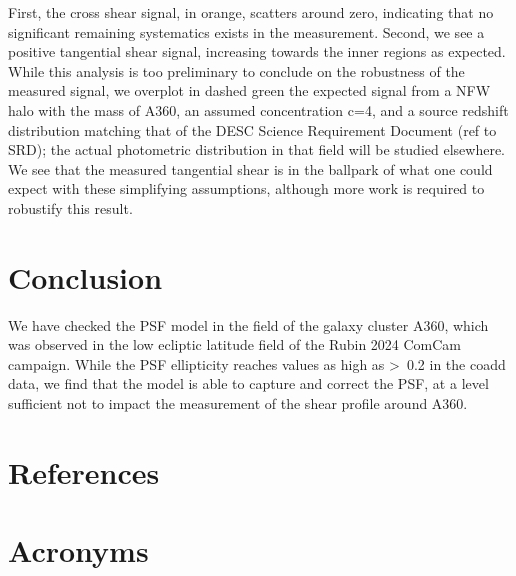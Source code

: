 \documentclass[SE,lsstdraft,authoryear,toc]{lsstdoc}
\begin{document}
First, the cross shear signal, in orange, scatters around zero, indicating that no significant remaining systematics exists in the measurement. Second, we see a positive tangential shear signal, increasing towards the inner regions as expected. While this analysis is too preliminary to conclude on the robustness of the measured signal, we overplot in dashed green the expected signal from a NFW halo with the mass of A360, an assumed concentration c=4, and a source redshift distribution matching that of the DESC Science Requirement Document (ref to SRD); the actual photometric distribution in that field will be studied elsewhere. We see that the measured tangential shear is in the ballpark of what one could expect with these simplifying assumptions, although more work is required to robustify this result.


\section{Conclusion}
We have checked the PSF model in the field of the galaxy cluster A360, which was observed in the low ecliptic latitude field of the Rubin 2024 ComCam campaign. While the PSF ellipticity reaches values as high as >~0.2 in the coadd data, we find that the model is able to capture and correct the PSF, at a level sufficient not to impact the measurement of the shear profile around A360. 


\appendix
\section{References} \label{sec:bib}
\renewcommand{\refname}{} %

\section{Acronyms} \label{sec:acronyms}

\end{document}
